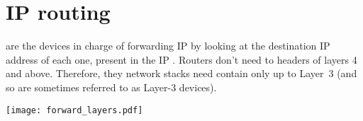 \section{IP routing}\label{sec:layer3:routing}

 are the devices in charge of forwarding IP 
by looking at the destination IP address of each one, present in the IP . Routers don't need 
to  headers of layers 4 and above. Therefore, they network stacks need contain only up to Layer~3
(and so are sometimes referred to as Layer-3 devices).

\begin{center}
\texttt{[image: forward\_layers.pdf]}
\end{center}


